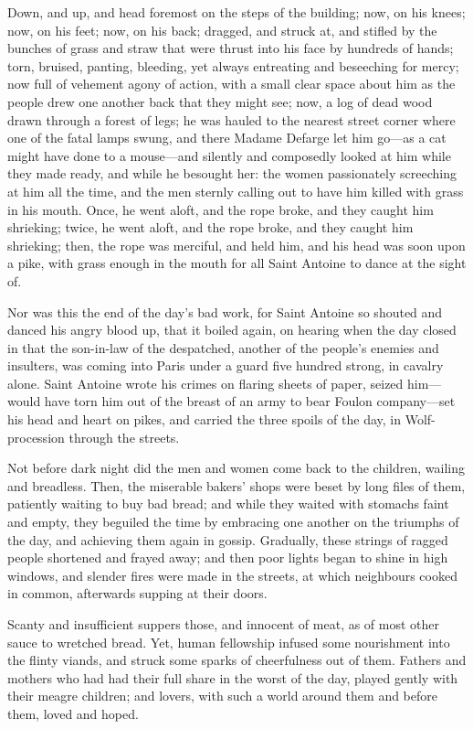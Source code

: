 Down, and up, and head foremost on the steps of the building; now, on
his knees; now, on his feet; now, on his back; dragged, and struck at,
and stifled by the bunches of grass and straw that were thrust into his
face by hundreds of hands; torn, bruised, panting, bleeding, yet always
entreating and beseeching for mercy; now full of vehement agony of
action, with a small clear space about him as the people drew one
another back that they might see; now, a log of dead wood drawn through
a forest of legs; he was hauled to the nearest street corner where one
of the fatal lamps swung, and there Madame Defarge let him go---as a
cat might have done to a mouse---and silently and composedly looked
at him while they made ready, and while he besought her:  the women
passionately screeching at him all the time, and the men sternly
calling out to have him killed with grass in his mouth.  Once, he went
aloft, and the rope broke, and they caught him shrieking; twice, he went
aloft, and the rope broke, and they caught him shrieking; then, the rope
was merciful, and held him, and his head was soon upon a pike, with
grass enough in the mouth for all Saint Antoine to dance at the sight of.

Nor was this the end of the day's bad work, for Saint Antoine so
shouted and danced his angry blood up, that it boiled again, on
hearing when the day closed in that the son-in-law of the despatched,
another of the people's enemies and insulters, was coming into Paris
under a guard five hundred strong, in cavalry alone.  Saint Antoine
wrote his crimes on flaring sheets of paper, seized him---would have
torn him out of the breast of an army to bear Foulon company---set
his head and heart on pikes, and carried the three spoils of the day,
in Wolf-procession through the streets.

Not before dark night did the men and women come back to the children,
wailing and breadless.  Then, the miserable bakers' shops were beset
by long files of them, patiently waiting to buy bad bread; and while
they waited with stomachs faint and empty, they beguiled the time by
embracing one another on the triumphs of the day, and achieving them
again in gossip.  Gradually, these strings of ragged people shortened
and frayed away; and then poor lights began to shine in high windows,
and slender fires were made in the streets, at which neighbours cooked
in common, afterwards supping at their doors.

Scanty and insufficient suppers those, and innocent of meat, as of
most other sauce to wretched bread.  Yet, human fellowship infused
some nourishment into the flinty viands, and struck some sparks of
cheerfulness out of them.  Fathers and mothers who had had their full
share in the worst of the day, played gently with their meagre
children; and lovers, with such a world around them and before them,
loved and hoped.

